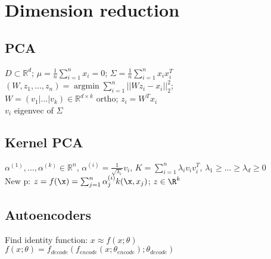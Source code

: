 \section*{Dimension reduction}
\subsection*{PCA}
$D\subset \mathbb{R}^d$; $\mu = \frac{1}{n}\sum_{i=1}^nx_i=0$; 
$\Sigma = \frac{1}{n}\sum_{i=1}^n x_i x_i^T$\\
$(W,z_1,...,z_n) = \operatorname{argmin} \sum_{i=1}^n||W z_i - x_i||_2^2$;\\
$W = (v_1|...|v_k) \in \mathbb{R}^{d \times k}$ ortho; $z_i = W^T x_i$ \\ 
$v_i$ eigenvec of $\Sigma$

\subsection*{Kernel PCA}
$\alpha^{(1)},...,\alpha^{(k)}\in \mathbb{R}^n$, $\alpha^{(i)} = \frac{1}{\sqrt{\lambda_i}}v_i$, $K = \sum_{i=1}^n \lambda_i v_i v_i^T$, $\lambda_1 \geq ... \geq \lambda_d \geq 0$\\
New p: $z = f(\x) = \sum_{j=1}^n\alpha_j^{(i)}k(\x,x_j)$; $z\in \R^k$

\subsection*{Autoencoders}
Find identity function: $x \approx f(x;\theta)$\\
$f(x;\theta) = f_{decode}(f_{encode}(x;\theta_{encode});\theta_{decode})$
